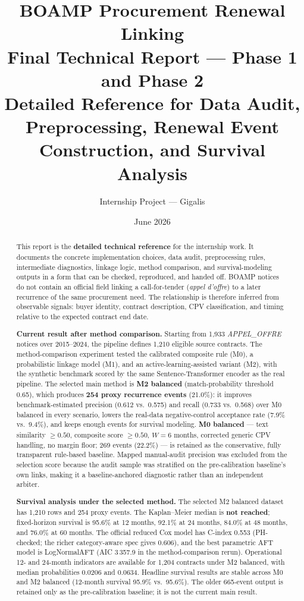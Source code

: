 \documentclass[12pt, a4paper]{article}
\title{
  \textbf{BOAMP Procurement Renewal Linking}\\[0.4em]
  \large Final Technical Report --- Phase 1 and Phase 2\\[0.3em]
  \normalsize Detailed Reference for Data Audit, Preprocessing, Renewal Event Construction, and Survival Analysis
}
\author{Internship Project --- Gigalis}
\date{June 2026}
\begin{document}
\maketitle
\thispagestyle{fancy}

\begin{abstract}
This report is the \textbf{detailed technical reference} for the internship
work. It documents the concrete implementation choices, data audit,
preprocessing rules, intermediate diagnostics, linkage logic, method
comparison, and survival-modeling outputs in a form that can be checked,
reproduced, and handed off. BOAMP notices do not contain an official field
linking a call-for-tender (\textit{appel d'offre}) to a later recurrence of the
same procurement need. The relationship is therefore inferred from observable
signals: buyer identity, contract description, CPV classification, and timing
relative to the expected contract end date.

\textbf{Current result after method comparison.} Starting from 1,933
\textit{APPEL\_OFFRE} notices over 2015--2024, the pipeline defines 1,210
eligible source contracts. The method-comparison experiment tested the
calibrated composite rule (M0), a probabilistic linkage model (M1), and an
active-learning-assisted variant (M2), with the synthetic benchmark scored by
the same Sentence-Transformer encoder as the real pipeline. The selected main
method is \textbf{M2 balanced} (match-probability threshold 0.65), which
produces \textbf{254 proxy recurrence events} (21.0\%): it improves
benchmark-estimated precision (0.612 vs.\ 0.575) and recall (0.733 vs.\ 0.568)
over M0 balanced in every scenario, lowers the real-data negative-control
acceptance rate (7.9\% vs.\ 9.4\%), and keeps enough events for survival
modeling. \textbf{M0 balanced} --- text similarity $\geq 0.50$, composite score
$\geq 0.50$, $W=6$ months, corrected generic CPV handling, no margin floor;
269 events (22.2\%) --- is retained as the conservative, fully transparent
rule-based baseline. Mapped manual-audit precision was excluded from the
selection score because the audit sample was stratified on the pre-calibration
baseline's own links, making it a baseline-anchored diagnostic rather than an
independent arbiter.

\textbf{Survival analysis under the selected method.} The selected M2 balanced
dataset has 1,210 rows and 254 proxy events. The Kaplan--Meier median is
\textbf{not reached}; fixed-horizon survival is 95.6\% at 12 months, 92.1\% at
24 months, 84.0\% at 48 months, and 76.0\% at 60 months. The official reduced
Cox model has C-index 0.553 (PH-checked; the richer category-aware spec gives
0.606), and the best parametric AFT model is LogNormalAFT (AIC 3\,357.9 in the
method-comparison rerun). Operational 12- and 24-month indicators are available
for 1,204 contracts under M2 balanced, with median probabilities 0.0206 and
0.0634. Headline survival results are stable across M0 and M2 balanced
(12-month survival 95.9\% vs.\ 95.6\%). The older 665-event output is retained
only as the pre-calibration baseline; it is not the current main result.
\end{abstract}
\end{document}
